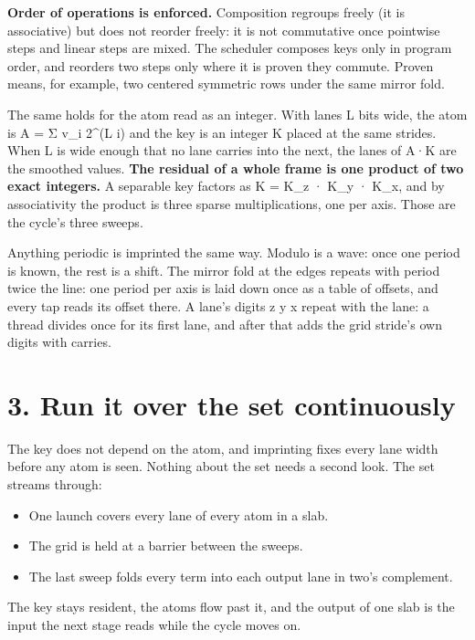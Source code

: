 \textbf{Order of operations is enforced.} Composition regroups freely (it is associative) but does not reorder freely: it is not commutative once pointwise steps and linear steps are mixed. The scheduler composes keys only in program order, and reorders two steps only where it is proven they commute. Proven means, for example, two centered symmetric rows under the same mirror fold.

The same holds for the atom read as an integer. With lanes L bits wide, the atom is A = Σ v\_\allowbreak{}i 2\textasciicircum{}(L i) and the key is an integer K placed at the same strides. When L is wide enough that no lane carries into the next, the lanes of A·K are the smoothed values. \textbf{The residual of a whole frame is one product of two exact integers.} A separable key factors as K = K\_\allowbreak{}z · K\_\allowbreak{}y · K\_\allowbreak{}x, and by associativity the product is three sparse multiplications, one per axis. Those are the cycle's three sweeps.

Anything periodic is imprinted the same way. Modulo is a wave: once one period is known, the rest is a shift. The mirror fold at the edges repeats with period twice the line: one period per axis is laid down once as a table of offsets, and every tap reads its offset there. A lane's digits z y x repeat with the lane: a thread divides once for its first lane, and after that adds the grid stride's own digits with carries.

\section{\texorpdfstring{3. Run it over the set continuously}{3. Run it over the set continuously}}

The key does not depend on the atom, and imprinting fixes every lane width before any atom is seen. Nothing about the set needs a second look. The set streams through:

\begin{itemize}
\item One launch covers every lane of every atom in a slab.
\item The grid is held at a barrier between the sweeps.
\item The last sweep folds every term into each output lane in two's complement.
\end{itemize}

The key stays resident, the atoms flow past it, and the output of one slab is the input the next stage reads while the cycle moves on.

